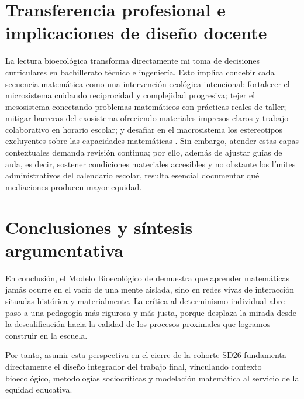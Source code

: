 \documentclass[spanish,letterpaper,oneside]{article}
\begin{document}
\section{Transferencia profesional e implicaciones de diseño docente}
La lectura bioecológica transforma directamente mi toma de decisiones curriculares en bachillerato técnico e ingeniería. Esto implica concebir cada secuencia matemática como una intervención ecológica intencional: fortalecer el microsistema cuidando reciprocidad y complejidad progresiva; tejer el mesosistema conectando problemas matemáticos con prácticas reales de taller; mitigar barreras del exosistema ofreciendo materiales impresos claros y trabajo colaborativo en horario escolar; y desafiar en el macrosistema los estereotipos excluyentes sobre las capacidades matemáticas \citep{eef2017mathematics}. Sin embargo, atender estas capas contextuales demanda revisión continua; por ello, además de ajustar guías de aula, es decir, sostener condiciones materiales accesibles y no obstante los límites administrativos del calendario escolar, resulta esencial documentar qué mediaciones producen mayor equidad.

\clearpage
\section{Conclusiones y síntesis argumentativa}
En conclusión, el Modelo Bioecológico de \citet{bronfenbrenner2006bioecologico} demuestra que aprender matemáticas jamás ocurre en el vacío de una mente aislada, sino en redes vivas de interacción situadas histórica y materialmente. La crítica al determinismo individual abre paso a una pedagogía más rigurosa y más justa, porque desplaza la mirada desde la descalificación hacia la calidad de los procesos proximales que logramos construir en la escuela.

Por tanto, asumir esta perspectiva en el cierre de la cohorte SD26 fundamenta directamente el diseño integrador del trabajo final, vinculando contexto bioecológico, metodologías sociocríticas y modelación matemática al servicio de la equidad educativa.
\end{document}
